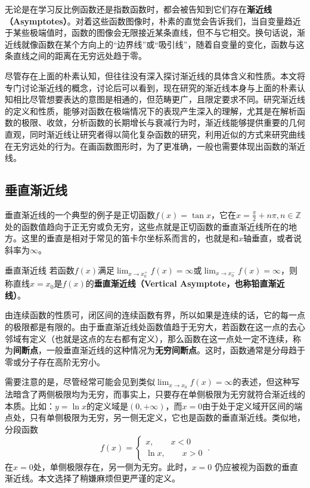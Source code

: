 
\begin{issues}
\issueDraft
\end{issues}

无论是在学习反比例函数还是指数函数时，都会被告知到它们存在\textbf{渐近线（Asymptotes）}。对着这些函数图像时，朴素的直觉会告诉我们，当自变量趋近于某些极端值时，函数的图像会无限接近某条直线，但不与它相交。换句话说，渐近线就像函数在某个方向上的“边界线”或“吸引线”，随着自变量的变化，函数与这条直线之间的距离在无穷远处趋于零。

尽管存在上面的朴素认知，但往往没有深入探讨渐近线的具体含义和性质。本文将专门讨论渐近线的概念，讨论后可以看到，现在研究的渐近线本身与上面的朴素认知相比尽管想要表达的意图是相通的，但范畴更广，且限定要求不同。研究渐近线的定义和性质，能够对函数在极端情况下的表现产生深入的理解，尤其是在解析函数的极限、收敛，分析函数的长期增长与衰减行为时，渐近线能够提供重要的几何直观，同时渐近线让研究者得以简化复杂函数的研究，利用近似的方式来研究曲线在无穷远处的行为。在画函数图形时，为了更准确，一般也需要体现出函数的渐近线。


\subsection{垂直渐近线}

垂直渐近线的一个典型的例子是正切函数$f(x)=\tan x$，它在$\displaystyle x = \frac{\pi}{2} + n\pi,n \in \mathbb{Z}$处的函数值趋向于正无穷或负无穷，这些点就是正切函数的垂直渐近线所在的地方。这里的垂直是相对于常见的笛卡尔坐标系而言的，也就是和$x$轴垂直，或者说斜率为$\infty$。

\begin{definition}{垂直渐近线}
若函数$f(x)$满足$\displaystyle \lim_{x\to x_0^+}f(x)=\infty$或$\displaystyle \lim_{x\to x_0^-}f(x)=\infty$，则称直线$x=x_0$是$f(x)$的\textbf{垂直渐近线（Vertical Asymptote，也称铅直渐近线）}。
\end{definition}

由连续函数的性质可，闭区间的连续函数有界，所以如果是连续的话，它的每一点的极限都是有限的。由于垂直渐近线处函数值趋于无穷大，若函数在这一点的去心邻域有定义（也就是这点的左右都有定义），那么函数在这一点处一定不连续，称为\textbf{间断点}，一般垂直渐近线的这种情况为\textbf{无穷间断点}。这时，函数通常是分母趋于零或分子存在高阶无穷小。

需要注意的是，尽管经常可能会见到类似$\displaystyle \lim_{x\to x_0}f(x)=\infty$的表述，但这种写法暗含了两侧极限均为无穷，而事实上，只要存在单侧极限为无穷就符合渐近线的本质。比如：$y=\ln x$的定义域是$(0,+\infty)$，而$x=0$由于处于定义域开区间的端点处，只有单侧极限为无穷，另一侧无定义，它也是函数的垂直渐近线。类似地，分段函数
\begin{equation}
f(x)=\begin{cases}
x,\qquad x<0\\
\ln x,\qquad x>0
\end{cases}~.
\end{equation}
在$x=0$处，单侧极限存在，另一侧为无穷。此时，$x = 0$ 仍应被视为函数的垂直渐近线。本文选择了稍嫌麻烦但更严谨的定义。

